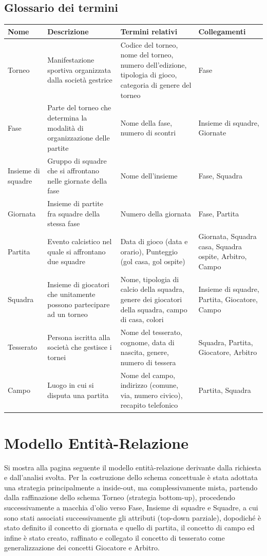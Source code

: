 \documentclass[11pt, openany]{article}
\theoremstyle{definition}
\theoremstyle{plain}
\theoremstyle{remark}
\begin{document}
			\newpage\subsection{Glossario dei termini}
				\begin{tabularx}{\textwidth}{p{1.8cm}p{6cm}Xp{3.5cm}}
					\textbf{Nome} & \textbf{Descrizione} & \textbf{Termini relativi} & \textbf{Collegamenti}\\\toprule[1.2pt]
					Torneo & Manifestazione sportiva organizzata dalla società gestrice & Codice del torneo, nome del torneo, numero dell’edizione, tipologia di gioco, categoria di genere del torneo & Fase\\\midrule
					Fase & Parte del torneo che determina la modalità di organizzazione delle partite & Nome della fase, numero di scontri & Insieme di squadre, Giornate\\\midrule
					Insieme di squadre & Gruppo di squadre che si affrontano nelle giornate della fase & Nome dell'insieme & Fase, Squadra\\\midrule
					Giornata & Insieme di partite fra squadre della stessa fase & Numero della giornata & Fase, Partita\\\midrule
					Partita & Evento calcistico nel quale si affrontano due squadre & Data di gioco (data e	orario), Punteggio (gol casa, gol ospite) & Giornata, Squadra casa, Squadra ospite, Arbitro, Campo\\\midrule
					Squadra & Insieme di giocatori che unitamente possono partecipare ad un torneo & Nome, tipologia di calcio della squadra, genere dei giocatori della squadra, campo di	casa, colori & Insieme di squadre, Partita, Giocatore, Campo\\\midrule
					Tesserato & Persona iscritta alla società che gestisce i tornei & Nome del tesserato, cognome, data di nascita, genere, numero di tessera & Squadra, Partita, Giocatore, Arbitro\\\midrule
					Campo & Luogo in cui si disputa una partita & Nome del campo, indirizzo (comune, via, numero civico), recapito telefonico & Partita, Squadra
				\end{tabularx}
				
		\section{Modello Entità-Relazione}
			Si mostra alla pagina seguente il modello entità-relazione derivante dalla richiesta e dall’analisi svolta.	Per la costruzione dello schema concettuale è stata adottata una strategia principalmente a inside-out,	ma complessivamente mista, partendo dalla raffinazione dello schema Torneo (strategia bottom-up), procedendo successivamente a macchia d’olio verso Fase, Insieme di squadre e Squadre, a cui sono stati associati successivamente gli attributi (top-down parziale), dopodiché è stato definito il concetto di giornata e quello di partita, il concetto di campo ed infine è stato creato, raffinato e collegato il concetto di tesserato come generalizzazione dei concetti Giocatore e Arbitro.
			
\end{document}
